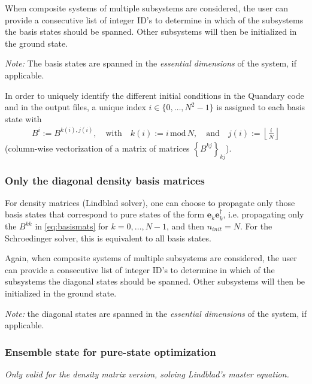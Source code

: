 \documentclass[11pt]{article}
\begin{document}
When composite systems of multiple subsystems are considered, the user can provide a consecutive list of integer ID's to determine in which of the subsystems the basis states should be spanned. Other subsystems will then be initialized in the ground state.

\textit{Note:} The basis states are spanned in the \textit{essential dimensions} of the system, if applicable. 

In order to uniquely identify the different initial conditions in the Quandary code and in the output files, a
unique index $i \in \{0,\dots, N^2-1\}$ is assigned to each basis state with 
\begin{align*}
  B^i := B^{k(i), j(i)}, \quad \text{with} \quad k(i) := i \,\mbox{mod}\, N,
  \quad \text{and} \quad j(i) := \left\lfloor \frac{i}{N} \right\rfloor
\end{align*}
(column-wise vectorization of a matrix of matrices $\left\{B^{kj}\right\}_{kj}$). 



\subsubsection{Only the diagonal density basis matrices}

For density matrices (Lindblad solver), one can choose to propagate only those basis states that correspond to pure states of the form $\boldsymbol{e}_k\boldsymbol{e}_k^\dagger$, i.e. propagating only the $B^{kk}$ in \eqref{eq:basismats} for $k=0,\dots, N-1$, and then $n_{init}=N$. For the Schroedinger solver, this is equivalent to all basis states. 

Again, when composite systems of multiple subsystems are considered, the user can provide a consecutive list of integer ID's to determine in which of the subsystems the diagonal states should be spanned. Other subsystems will then be initialized in the ground state.

\textit{Note:} the diagonal states are spanned in the \textit{essential dimensions} of the system, if applicable. 



\subsubsection{Ensemble state for pure-state optimization}\label{sec:ensemblestate}
\textit{Only valid for the density matrix version, solving Lindblad's master equation.}
\end{document}
